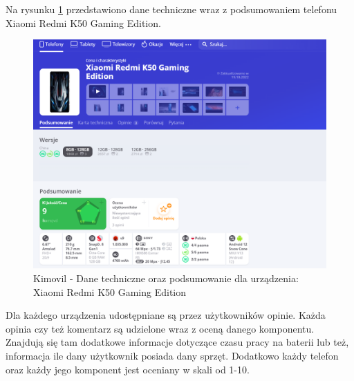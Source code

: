 Na rysunku \ref*{kimovil_3} przedstawiono dane techniczne wraz z podsumowaniem telefonu Xiaomi Redmi K50 Gaming Edition.

\begin{figure}[H]
    \centering
    \includegraphics[scale=0.45]{img/Kimovil/kimovilDetails.png}
    \caption{Kimovil - Dane techniczne oraz podsumowanie dla urządzenia: Xiaomi Redmi K50 Gaming Edition}
    \label{kimovil_3}
\end{figure}

Dla każdego urządzenia udostępniane są przez użytkowników opinie. Każda opinia czy też komentarz są udzielone wraz z oceną danego komponentu. Znajdują się tam dodatkowe informacje dotyczące czasu pracy na baterii lub też, informacja ile dany użytkownik posiada dany sprzęt. Dodatkowo każdy telefon oraz każdy jego komponent jest oceniany w skali od 1-10.

